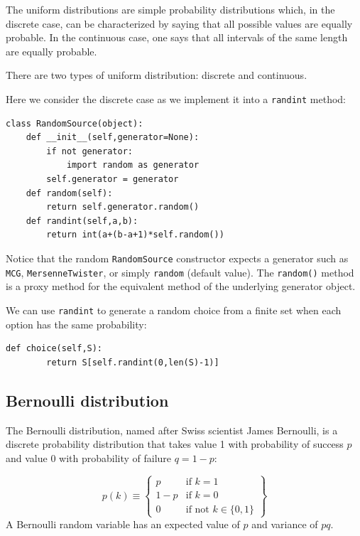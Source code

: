 \documentclass[justified,sixbynine]{tufte-book}
\def\ft{\small\tt}
\theoremstyle{plain}%
\theoremstyle{definition}
\theoremstyle{remark}
\begin{document}
\begin{fullwidth}
The uniform distributions are simple probability distributions which, in the
discrete case, can be characterized by saying that all possible values are
equally probable. In the continuous case, one says that all intervals of the
same length are equally probable.

There are two types of uniform distribution: discrete and continuous.

Here we consider the discrete case as we implement it into a {\ft randint} method:


\begin{lstlisting}[caption={in file: {\ft nlib.py}}]
class RandomSource(object):
    def __init__(self,generator=None):
        if not generator:
            import random as generator
        self.generator = generator
    def random(self):
        return self.generator.random()
    def randint(self,a,b):
        return int(a+(b-a+1)*self.random())
\end{lstlisting}

Notice that the random {\ft RandomSource} constructor expects a generator such as {\ft MCG}, {\ft MersenneTwister}, or simply {\ft random} (default value). The {\ft random()} method is a proxy method for the equivalent method of the underlying generator object.

We can use {\ft randint} to generate a random choice from a finite set when each option has the same probability:

\begin{lstlisting}[caption={in file: {\ft nlib.py}}]
    def choice(self,S):
        return S[self.randint(0,len(S)-1)]
\end{lstlisting}

\goodbreak\subsection{Bernoulli distribution}

The Bernoulli distribution, named after Swiss scientist James Bernoulli, is
a discrete probability distribution that takes value 1 with
probability of success $p$ and value 0 with probability of failure $q=1-p$:

\begin{equation}
p(k) \equiv \left\{
\begin{array}{ll}
p & \text{if }k=1 \\
1-p & \text{if }k=0 \\
0 & \text{if not }k \in \{0,1\}
\end{array}
\right\}
\end{equation}
A Bernoulli random variable has an expected value of $p$ and variance of $pq$.


\end{fullwidth}
\end{document}
